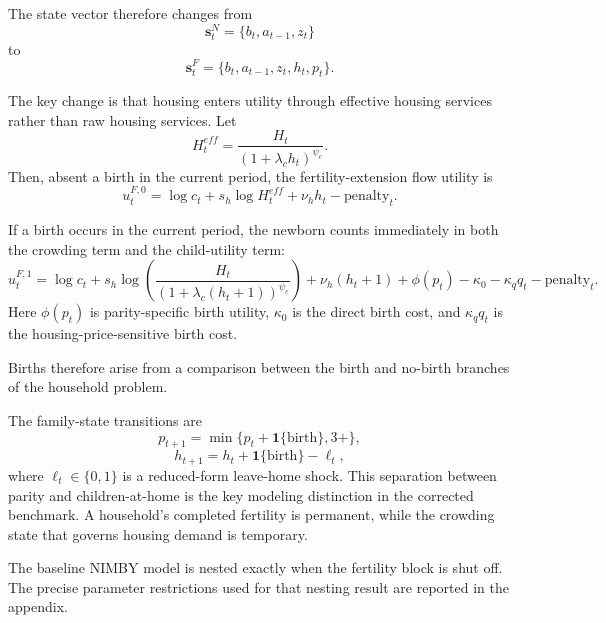 \documentclass[11pt]{article}
\begin{document}
The state vector therefore changes from
\begin{equation}
\mathbf{s}^{N}_t = \{b_t, a_{t-1}, z_t\}
\end{equation}
to
\begin{equation}
\mathbf{s}^{F}_t = \{b_t, a_{t-1}, z_t, h_t, p_t\}.
\end{equation}

The key change is that housing enters utility through effective housing services rather than raw
housing services. Let
\begin{equation}
H_t^{eff} = \frac{H_t}{(1+\lambda_c h_t)^{\psi_c}}.
\end{equation}
Then, absent a birth in the current period, the fertility-extension flow utility is
\begin{equation}
u^{F,0}_t = \log c_t + s_h \log H_t^{eff} + \nu_h h_t - \text{penalty}_t.
\end{equation}

If a birth occurs in the current period, the newborn counts immediately in both the crowding term
and the child-utility term:
\begin{equation}
u^{F,1}_t = \log c_t + s_h \log \left(\frac{H_t}{(1+\lambda_c(h_t+1))^{\psi_c}}\right)
+ \nu_h(h_t+1) + \phi(p_t) - \kappa_0 - \kappa_q q_t - \text{penalty}_t.
\end{equation}
Here $\phi(p_t)$ is parity-specific birth utility, $\kappa_0$ is the direct birth cost, and
$\kappa_q q_t$ is the housing-price-sensitive birth cost.

Births therefore arise from a comparison between the birth and no-birth branches of the
household problem.

The family-state transitions are
\begin{equation}
p_{t+1} = \min\{p_t + \mathbf{1}\{\text{birth}\}, 3+\},
\end{equation}
\begin{equation}
h_{t+1} = h_t + \mathbf{1}\{\text{birth}\} - \ell_t,
\end{equation}
where $\ell_t \in \{0,1\}$ is a reduced-form leave-home shock. This separation between parity and
children-at-home is the key modeling distinction in the corrected benchmark. A household's
completed fertility is permanent, while the crowding state that governs housing demand is
temporary.

The baseline NIMBY model is nested exactly when the fertility block is shut off. The precise
parameter restrictions used for that nesting result are reported in the appendix.
\end{document}
